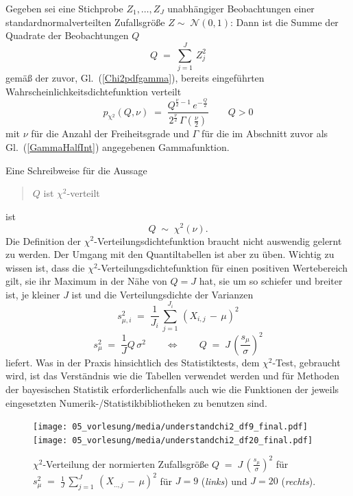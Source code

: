 Gegeben sei eine Stichprobe $Z_1, \dots, Z_J$ unabhängiger Beobachtungen einer
standardnormalverteilten Zufallsgröße $Z  \sim \; \mathcal{N}(0, 1)$:
Dann ist die Summe der Quadrate der Beobachtungen $Q$
\begin{equation}
Q \; = \; \sum_{j=1}^J \, Z_j^2
\end{equation}
gemäß der zuvor, Gl.~(\ref{Chi2pdfgamma}), bereits eingeführten Wahrscheinlichkeitsdichtefunktion verteilt
\begin{equation}
p_\mathrm{\chi^2}(Q, \nu) \; = \; \frac{Q^{\frac{\nu}{2} - 1} \,
 e^{-\frac{Q}{2}}}{2^{\frac{\nu}{2}} \, \Gamma(\frac{\nu}{2})} \qquad Q > 0
 \label{Chi2pdf}
\end{equation}
mit $\nu$ für die Anzahl der Freiheitsgrade und $\Gamma$ für die
im Abschnitt zuvor als Gl.~(\ref{GammaHalfInt}) angegebenen Gammafunktion.

Eine Schreibweise für die Aussage
\begin{quote}
$Q$ ist $\chi^2$-verteilt
\end{quote}
ist
\begin{equation}
Q \; \sim \; \chi^2(\nu).
\label{Chi2verteilt}
\end{equation}
Die Definition der $\chi^2$-Verteilungsdichtefunktion braucht nicht auswendig gelernt zu
werden. Der Umgang mit den Quantiltabellen ist aber zu üben.
Wichtig zu wissen ist, dass die $\chi^2$-Verteilungs\-dichte\-funktion für
einen positiven Wertebereich gilt, sie ihr Maximum in der Nähe von $Q = J$ hat, sie um so
schiefer und breiter ist, je kleiner $J$ ist und die Verteilungsdichte der Varianzen
\begin{equation}
s_{\mu,i}^2 \; = \; \frac{1}{J_i} \, \sum_{j=1}^{J_i} \, (X_{i,j} \, - \, \mu)^2
\end{equation}
\begin{equation}
s_{\mu}^2 \; = \; \frac{1}{J} Q \, \sigma^2  \qquad \Leftrightarrow \qquad
Q \; = \; J \, \left( \frac{s_{\mu}}{\sigma} \right)^2
\label{s2Q}
\end{equation}
liefert. Was in der Praxis hinsichtlich des Statistiktests, dem $\chi^2$-Test, gebraucht wird,
ist das Verständnis wie die Tabellen verwendet werden
und für Methoden der bayesischen Statistik erforderlichenfalls auch wie die
Funktionen der jeweils eingesetzten Numerik-/Statistik\-biblio\-theken zu benutzen sind.

\begin{figure}
\begin{center}
\texttt{[image: 05\_vorlesung/media/understandchi2\_df9\_final.pdf]} \hspace{5mm}
\texttt{[image: 05\_vorlesung/media/understandchi2\_df20\_final.pdf]}
\caption{\label{ch2beispiele}$\chi^2$-Verteilung der normierten
Zufallsgröße $Q \; = \; J \, \left( \frac{s_{\mu}}{\sigma} \right)^2$ für
$s_{\mu}^2 \; = \; \frac{1}{J} \, \sum_{j=1}^{J} \, (X_{..,j} \, - \, \mu)^2$
für $J = 9$  (\textsl{links}) und $J = 20$ (\textsl{rechts}).}
\end{center}
\end{figure}

